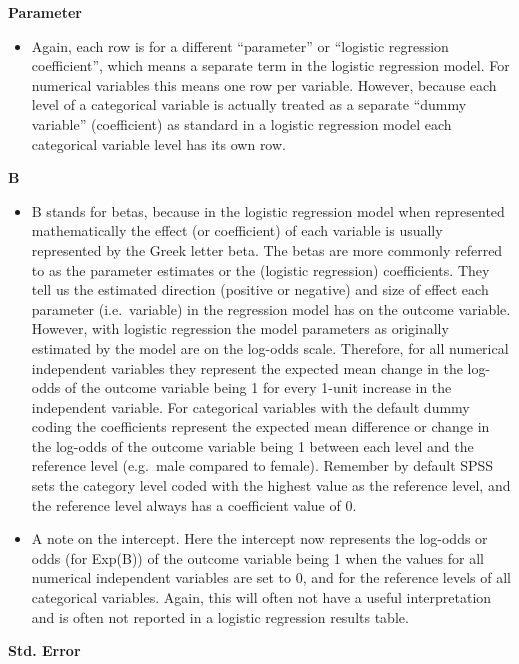 \documentclass[
]{book}
\providecommand{\tightlist}{%
  \setlength{\itemsep}{0pt}\setlength{\parskip}{0pt}}
\begin{document}
\textbf{Parameter}

\begin{itemize}
\tightlist
\item
  Again, each row is for a different ``parameter'' or ``logistic regression coefficient'', which means a separate term in the logistic regression model. For numerical variables this means one row per variable. However, because each level of a categorical variable is actually treated as a separate ``dummy variable'' (coefficient) as standard in a logistic regression model each categorical variable level has its own row.
\end{itemize}

\textbf{B}

\begin{itemize}
\item
  B stands for betas, because in the logistic regression model when represented mathematically the effect (or coefficient) of each variable is usually represented by the Greek letter beta. The betas are more commonly referred to as the parameter estimates or the (logistic regression) coefficients. They tell us the estimated direction (positive or negative) and size of effect each parameter (i.e.~variable) in the regression model has on the outcome variable. However, with logistic regression the model parameters as originally estimated by the model are on the log-odds scale. Therefore, for all numerical independent variables they represent the expected mean change in the log-odds of the outcome variable being 1 for every 1-unit increase in the independent variable. For categorical variables with the default dummy coding the coefficients represent the expected mean difference or change in the log-odds of the outcome variable being 1 between each level and the reference level (e.g.~male compared to female). Remember by default SPSS sets the category level coded with the highest value as the reference level, and the reference level always has a coefficient value of 0.
\item
  A note on the intercept. Here the intercept now represents the log-odds or odds (for Exp(B)) of the outcome variable being 1 when the values for all numerical independent variables are set to 0, and for the reference levels of all categorical variables. Again, this will often not have a useful interpretation and is often not reported in a logistic regression results table.
\end{itemize}

\textbf{Std. Error}
\end{document}
